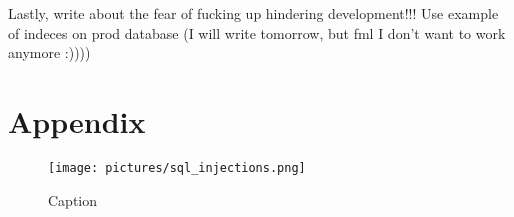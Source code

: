 \documentclass[11pt]{article}
\begin{document}
Lastly, write about the fear of fucking up hindering development!!! Use example of indeces on prod database (I will write tomorrow, but fml I don't want to work anymore :))))









 


\newpage




\section{Appendix}
\begin{figure}
    \centering
    \texttt{[image: pictures/sql\_injections.png]}
    \caption{Caption}
    \label{fig:sqlinjections}
\end{figure}
\end{document}
